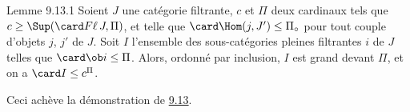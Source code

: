 \begin{enonce*}{Lemme 9.13.1}
Soient $J$ une catégorie filtrante, $c$ et $\Pi$ deux cardinaux tels
que $c\geq \Sup(\card  F\ell\,  J,\Pi)$, et telle que $\card
\Hom(j,J')\leq \Pi_\circ$ pour tout couple d'objets $j$, $j'$ de
$J$. Soit $I$ l'ensemble des sous-catégories pleines filtrantes $i$
de $J$ telles que $\card \ob i\leq \Pi$. Alors, ordonné par
inclusion, $I$ est grand devant $\Pi$, et on a $\card I\leq
c^{\Pi}$.
\end{enonce*}

Ceci achève la démonstration de \hyperref[I.prop9.13]{9.13}.

